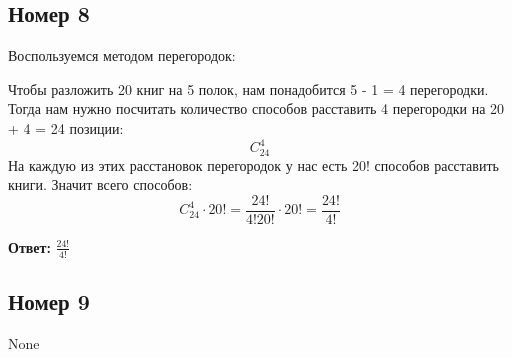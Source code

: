 \documentclass[a4paper,12pt]{article}
\begin{document}
\subsection*{Номер 8}
Воспользуемся методом перегородок:

Чтобы разложить 20 книг на 5 полок, нам понадобится 5 - 1 = 4 перегородки. Тогда нам нужно посчитать количество способов расставить 4 перегородки на 20 + 4 = 24 позиции:
\[
C_{24}^4
\]
На каждую из этих расстановок перегородок у нас есть 20! способов расставить книги. Значит всего способов:
\[
C_{24}^4 \cdot 20! = \frac{24!}{4! 20!} \cdot 20! = \frac{24!}{4!} 
\]
\begin{center}
\textbf{Ответ:} $\frac{24!}{4!} $
\end{center}
\subsection*{Номер 9}
None 
\end{document}
